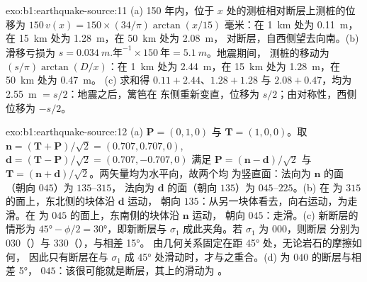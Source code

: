 \begin{solution}{exo:b1:earthquake-source:11}
(a) 150 年内，位于 $x$ 处的测桩相对断层上测桩的位移为 $150\,v(x) = 150\times(34/\pi)
\arctan(x/15)$ 毫米：在 \qty{1}{km} 处为 \qty{0.11}{m}，
在 \qty{15}{km} 处为 \qty{1.28}{m}，在 \qty{50}{km} 处为 \qty{2.08}{m}，
对断层，自西侧望去向南。(b) 滑移亏损为
$s = \qty{0.034}{m.\text{年}^{-1}}\times\qty{150}{\text{年}} = \qty{5.1}{m}$。地震期间，
测桩的移动为 $(s/\pi)\arctan(D/x)$：在
\qty{1}{km} 处为 \qty{2.44}{m}，在 \qty{15}{km} 处为 \qty{1.28}{m}，在 \qty{50}{km} 处为 \qty{0.47}{m}。
(c) 求和得 $0.11 + 2.44$、$1.28 + 1.28$ 与 $2.08 + 0.47$，均为
\qty{2.55}{m} $= s/2$：地震之后，篱笆在
东侧重新变直，位移为 $s/2$；由对称性，西侧位移为 $-s/2$。
\end{solution}

\begin{solution}{exo:b1:earthquake-source:12}
(a) $\mathbf P = (0, 1, 0)$ 与 $\mathbf T = (1, 0, 0)$。取
$\mathbf n = (\mathbf T + \mathbf P)/\sqrt2 = (0.707, 0.707, 0)$,
$\mathbf d = (\mathbf T - \mathbf P)/\sqrt2 = (0.707, -0.707, 0)$ 满足
$\mathbf P = (\mathbf n - \mathbf d)/\sqrt2$ 与 $\mathbf T = (\mathbf n +
\mathbf d)/\sqrt2$。两矢量均为水平向，故两个均
为竖直面：法向为 $\mathbf n$ 的面（朝向 $045$）为 $135$--$315$，
法向为 $\mathbf d$ 的面（朝向 $135$）为 $045$--$225$。(b) 在
为 $315$ 的面上，东北侧的块体沿 $\mathbf d$ 运动，
朝向 $135$：从另一块体看去，向右运动，为走滑。在
为 $045$ 的面上，东南侧的块体沿 $\mathbf n$ 运动，
朝向 $045$：走滑。(c) 新断层的情形为 $\ang{45} - \phi/2 =
\ang{30}$，即新断层与 $\sigma_1$ 成此夹角。若 $\sigma_1$ 为 $000$，则断层
分别为 $030$（）与 $330$（），与相差 \ang{15}。
由几何关系固定在距 \ang{45} 处，无论岩石的摩擦如何，
因此只有断层在与 $\sigma_1$ 成
\ang{45} 处滑动时，才与之重合。(d) 为 $040$ 的断层与相差 \ang{5}，
 $045$：该很可能就是断层，其上的滑动为
。
\end{solution}

